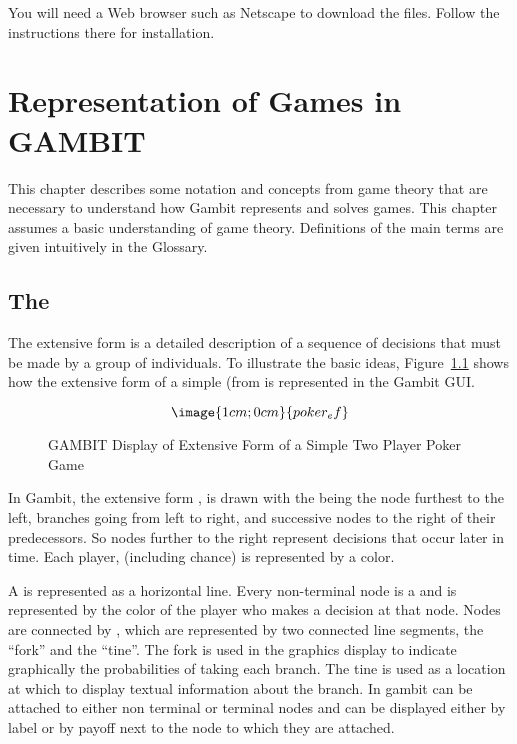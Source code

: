 You will need a Web browser such as Netscape to download the files.  Follow the 
instructions there for installation.  
 
\chapter{Representation of Games in GAMBIT}

This chapter describes some notation and concepts from game theory
that are necessary to understand how Gambit represents and solves
games.  This chapter assumes a basic understanding of game
theory.  Definitions of the main terms are given intuitively in the
Glossary.

\section{The }\label{extformsec}

The extensive form is a detailed description of a sequence of decisions 
that must be made by a group of individuals. To illustrate the basic ideas,
 Figure~\ref{fig_samp1} 
shows how the extensive form of a simple 
 (from \cite{Mye:91} is represented
 in the Gambit GUI.  

\begin{figure}\label{fig_samp1}
$$\image{1cm;0cm}{poker_ef}$$
\caption{GAMBIT Display of Extensive Form of
		a Simple Two Player Poker Game}\label{fig_samp1}
\end{figure}

In Gambit, the extensive form , is drawn with the 
 being the node furthest to the left,
branches going from left to right, and successive 
nodes to the right of 
their predecessors.  So nodes further to the right represent decisions 
that occur later in time.  Each player, (including chance) is represented by a color.  

A  is represented as a 
horizontal line.  Every non-terminal node is a  
and is represented by the color of the player who makes a decision at that node.  
Nodes are connected by , which are represented by two 
connected line segments, the ``fork'' and the ``tine''.  The fork is used in 
the graphics display to indicate graphically the probabilities of taking each 
branch.  The tine is used as a location at which to display textual information 
about the branch.  In gambit  can 
be attached to either non terminal or terminal nodes and can 
be displayed either by label or by payoff next to the node to 
which they are attached.  

